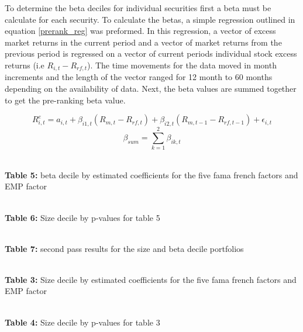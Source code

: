 To determine the beta deciles for individual securities first a beta must be calculate for each security. To calculate the betas, a  simple regression outlined in equation \eqref{prerank_reg} was preformed. In this regression, a vector of  excess market returns in the current period and a vector of market returns from the previous period is regressed on a vector of current periods individual stock excess returns (i.e $R_{i,t}-R_{rf,t}$). The time movements for the data moved in month increments and the length of the vector ranged for 12 month to 60 months depending on the availability of data. Next, the beta values are summed together to get the pre-ranking beta value. 

\begin{equation}
    R_{i,t}^e = a_{i,t} + \beta_{i1,t}(R_{m,t}-R_{rf,t})+\beta_{i2,t}(R_{m,t-1}-R_{rf,t-1})+\epsilon_{i,t}
    \label{prerank_reg}
\end{equation}
\begin{equation}
    \beta_{sum} = \sum_{k=1}^2\beta_{ik,t}
\end{equation}

\begin{center}

\\
\textbf{Table 5:} beta decile by estimated coefficients for the  five fama french factors and EMP factor
\end{center}
\begin{center}
\\
\textbf{Table 6:} Size decile by p-values for table 5
\end{center}
\begin{center}
\\
\textbf{Table 7:} second pass results for the size and beta decile portfolios
\end{center}

\begin{center}
\\
\textbf{Table 3:} Size decile by estimated coefficients for the  five fama french factors and EMP factor
\end{center}
\begin{center}
\\
\textbf{Table 4:} Size decile by p-values for table 3
\end{center}
